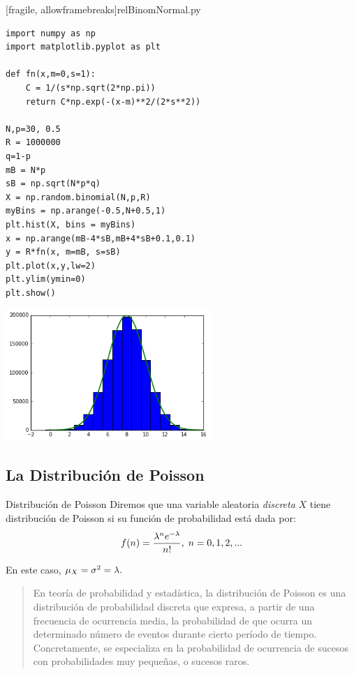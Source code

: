 [fragile, allowframebreaks]{relBinomNormal.py}
 \begin{verbatim}
import numpy as np
import matplotlib.pyplot as plt

def fn(x,m=0,s=1):
    C = 1/(s*np.sqrt(2*np.pi))
    return C*np.exp(-(x-m)**2/(2*s**2))

N,p=30, 0.5
R = 1000000
q=1-p
mB = N*p
sB = np.sqrt(N*p*q)
X = np.random.binomial(N,p,R)
myBins = np.arange(-0.5,N+0.5,1)
plt.hist(X, bins = myBins)
x = np.arange(mB-4*sB,mB+4*sB+0.1,0.1)
y = R*fn(x, m=mB, s=sB)
plt.plot(x,y,lw=2)
plt.ylim(ymin=0)
plt.show()
 \end{verbatim}
\begin{center}
 \includegraphics[height=5cm]{./pe/relBinNorm.png}
\end{center}



\subsection{La Distribución de Poisson}
{Distribución de Poisson} Diremos que una variable aleatoria \emph{discreta} $X$ tiene distribución de Poisson si su función de probabilidad está dada por:
 \begin{align}
  \label{eq:7.5}
  f(n)=\dfrac{\lambda^{n}e^{-\lambda}}{n!}, \; n=0,1,2,...
 \end{align}


En este caso, $\mu_{X}=\sigma^{2}=\lambda.$


\begin{quote}
 En teoría de probabilidad y estadística, la distribución de Poisson es una distribución de probabilidad discreta que expresa, a partir de una frecuencia de ocurrencia media, la probabilidad de que ocurra un determinado número de eventos durante cierto período de tiempo. Concretamente, se especializa en la probabilidad de ocurrencia de sucesos con probabilidades muy pequeñas, o sucesos raros.
\end{quote}

